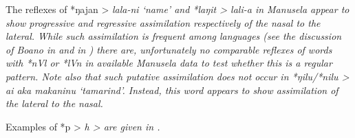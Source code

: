 The reflexes of *ŋajan > \it{lala-ni} ‘name’
and *laŋit > \it{lali-a} in Manusela appear to show progressive
and regressive assimilation respectively of the nasal to the lateral.
While such assimilation is frequent among  languages
(see the discussion of Boano in 
and  in ) there are,
unfortunately no comparable reflexes of words with *nVl or *lVn
in available Manusela data to test whether this is a regular pattern.
Note also that such putative assimilation does \it{not} occur
in *ŋilu/*nilu > \it{ai aka makaninu} ‘tamarind’.
Instead, this word appears to show assimilation of the lateral to the nasal.

Examples of *p > \it{h} > {\0} are given in .
\\


